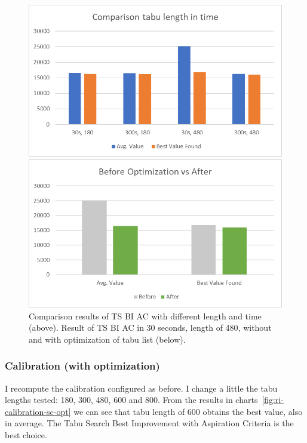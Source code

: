 	
			\begin{figure}[p]
				\centering
				\includegraphics[width=\linewidth]{img/RI-calibration-TabuLengthInTime}
				
				\vspace{1cm}
				
				\includegraphics[width=\linewidth]{img/RI-calibration-optimize}
				\caption{Comparison results of TS BI AC with different length and time (above). Result of TS BI AC in 30 seconds, length of 480, without and with optimization of tabu list (below).}
				\label{fig:ri-calibration-optimize}
			\end{figure}
		
\newpage
		

		
	\subsubsection{Calibration (with optimization)}
		I recompute the calibration configured as before. I change a little the tabu lengths tested: 180, 300, 480, 600 and 800. From the results in charts~\ref{fig:ri-calibration-sc-opt} we can see that tabu length of 600 obtains the best value, also in average. The Tabu Search Best Improvement with Aspiration Criteria is the best choice.
		
